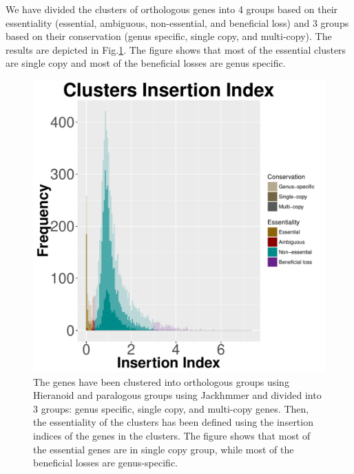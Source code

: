 \documentclass[12pt,letterpaper]{article}
\begin{document}
We have divided the clusters of orthologous genes into 4 groups based on their essentiality (essential, ambiguous, non-essential, and beneficial loss) and 3 groups based on their conservation (genus specific, single copy, and multi-copy). The results are depicted in Fig.\@ \ref{fig:iidist}. The figure shows that most of the essential clusters are single copy and most of the beneficial losses are genus specific.

\begin{figure}
\centering
\includegraphics[scale=0.5]{cluster-essentiality.pdf}
\caption{The genes have been clustered into orthologous groups using Hieranoid and paralogous groups using Jackhmmer and divided into 3 groups: genus specific, single copy, and multi-copy genes. Then, the essentiality of the clusters has been defined using the insertion indices of the genes in the clusters. The figure shows that most of the essential genes are in single copy group, while most of the beneficial losses are genus-specific.}
\label{fig:iidist}
\end{figure}
\end{document}
